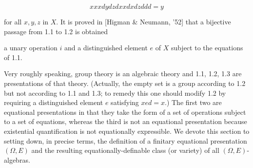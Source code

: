 $$xxxdydzdxxdxdzddd = y$$

for all $x, y, z$ in $X$. It is proved in [Higman & Neumann, '52] that a bijective passage from 1.1 to 1.2 is obtained

a unary operation $i$ and a distinguished element $e$ of $X$ subject to the equations of 1.1.

Very roughly speaking, group theory is an algebraic theory and 1.1, 1.2, 1.3 are presentations of that theory. (Actually, the empty set is a group according to 1.2 but not according to 1.1 and 1.3; to remedy this one should modify 1.2 by requiring a distinguished element $e$ satisfying $xed = x$.) The first two are equational presentations in that they take the form of a set of operations subject to a set of equations, whereas the third is not an equational presentation because existential quantification is not equationally expressible. We devote this section to setting down, in precise terms, the definition of a finitary equational presentation $(\Omega, E)$ and the resulting equationally-definable class (or variety) of all $(\Omega, E)$-algebras.